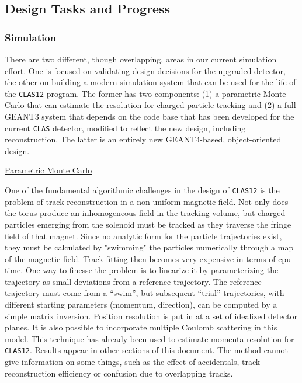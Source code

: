 \documentclass[12pt]{article}
\begin{document}
\subsection{Design Tasks and Progress}

\subsubsection{Simulation}

There are two different, though overlapping, areas in our current simulation 
effort. One is focused on validating design decisions for the upgraded 
detector, the other on building a modern simulation system that can be used 
for the life of the {\tt CLAS12} program. The former has two components: (1) a 
parametric Monte Carlo that can estimate the resolution for charged particle 
tracking and (2) a full GEANT3 system that depends on the code base that has 
been developed for the current {\tt CLAS} detector, modified to reflect the 
new design, including reconstruction. The latter is an entirely new 
GEANT4-based, object-oriented design.

\vskip 0.5cm

\noindent
\underline{Parametric Monte Carlo}

One of the fundamental algorithmic challenges in the design of {\tt CLAS12} 
is the problem of track reconstruction in a non-uniform magnetic field.  Not 
only does the torus produce an inhomogeneous field in the tracking volume, 
but charged particles emerging from the solenoid must be tracked as they 
traverse the fringe field of that magnet. Since no analytic form for the 
particle trajectories exist, they must be calculated by "swimming" the
particles numerically through a map of the magnetic field. Track fitting 
then becomes very expensive in terms of cpu time. One way to finesse the 
problem is to linearize it by parameterizing the trajectory as small deviations 
from a reference trajectory. The reference trajectory must come from a 
``swim'', but subsequent ``trial'' trajectories, with different starting 
parameters (momentum, direction), can be computed by a simple matrix 
inversion. Position resolution is put in at a set of idealized detector 
planes. It is also possible to incorporate multiple Coulomb scattering in 
this model. This technique has already been used to estimate momenta 
resolution for {\tt CLAS12}. Results appear in other sections of this 
document.  The method cannot give information on some things, such as the 
effect of accidentals, track reconstruction efficiency or confusion due to 
overlapping tracks.
\end{document}
